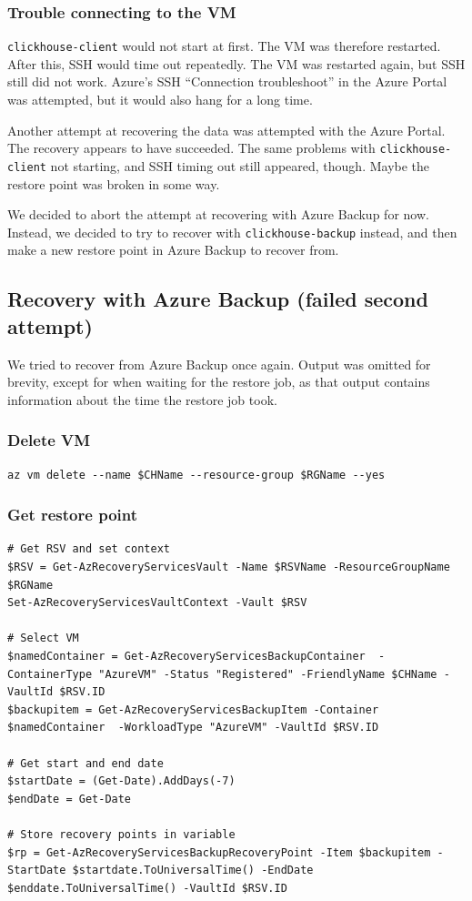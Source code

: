 \subsubsection{Trouble connecting to the VM}
\label{sec:org3c86200}
\texttt{clickhouse-client} would not start at first.
The VM was therefore restarted.
After this, SSH would time out repeatedly.
The VM was restarted again, but SSH still did not work.
Azure's SSH ``Connection troubleshoot'' in the Azure Portal was attempted,
but it would also hang for a long time.

Another attempt at recovering the data was attempted with the Azure Portal.
The recovery appears to have succeeded.
The same problems with \texttt{clickhouse-client} not starting,
and SSH timing out still appeared, though.
Maybe the restore point was broken in some way.

We decided to abort the attempt at recovering with Azure Backup for now.
Instead, we decided to try to recover with \texttt{clickhouse-backup} instead,
and then make a new restore point in Azure Backup to recover from.

\subsection{Recovery with Azure Backup (failed second attempt)}
\label{sec:org2c0f303}
We tried to recover from Azure Backup once again.
Output was omitted for brevity, except for when waiting for the restore job,
as that output contains information about the time the restore job took.

\subsubsection{Delete VM}
\label{sec:org0fbc45f}
\begin{verbatim}
az vm delete --name $CHName --resource-group $RGName --yes
\end{verbatim}

\subsubsection{Get restore point}
\label{sec:orgd8ba7ae}
\begin{verbatim}
# Get RSV and set context
$RSV = Get-AzRecoveryServicesVault -Name $RSVName -ResourceGroupName $RGName
Set-AzRecoveryServicesVaultContext -Vault $RSV

# Select VM
$namedContainer = Get-AzRecoveryServicesBackupContainer  -ContainerType "AzureVM" -Status "Registered" -FriendlyName $CHName -VaultId $RSV.ID
$backupitem = Get-AzRecoveryServicesBackupItem -Container $namedContainer  -WorkloadType "AzureVM" -VaultId $RSV.ID

# Get start and end date
$startDate = (Get-Date).AddDays(-7)
$endDate = Get-Date

# Store recovery points in variable
$rp = Get-AzRecoveryServicesBackupRecoveryPoint -Item $backupitem -StartDate $startdate.ToUniversalTime() -EndDate $enddate.ToUniversalTime() -VaultId $RSV.ID
\end{verbatim}

